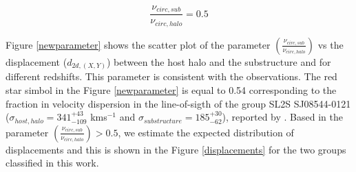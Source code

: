 \documentclass{emulateapj}
\begin{document}
\begin{equation}
 \frac{\nu_{circ,sub}}{\nu_{circ,halo}}=0.5
\end{equation}
 

Figure \ref{newparameter} shows the scatter plot of the parameter $\left(\frac{\nu_{circ,sub}}{\nu_{circ,halo}}\right)$ vs the 
displacement ($d_{2d,(X,Y)}$) between the host halo and the substructure and for different redshifts. This parameter is 
consistent with the observations. The red star simbol in the Figure \ref{newparameter} is equal to 0.54 corresponding to 
the fraction in velocity dispersion in the line-of-sigth of the group SL2S SJ08544-0121 ($\sigma_{host,halo}=341^{+43}_{-109}$ kms$^{-1}$ and $\sigma_{substructure}=185^{+30}_{-62}$), reported by \citet{2013A&A...552A..80M}.
Based in the parameter $\left(\frac{\nu_{circ,sub}}{\nu_{circ,halo}}\right)>0.5$, we estimate the expected distribution of
displacements and this is shown in the Figure \ref{displacements} for the two groups classified in this work.
 
  
\begin{figure*}
\begin{center}
\end{center}
\caption{Configuration for a host halo (dashed circle) and sub-structure (black circle) in the sample. } 
\label{configuration}
\end{figure*}


\begin{figure*}
\begin{center}
\end{center}
\caption{Scatter $\left(\frac{\nu_{circ,sub}}{\nu_{circ,halo}}\right)$
  vs $d_{2d,(X,Y)}$ for different redshifts. The  horizontal dashed
  line correpond to
  $\left(\frac{\nu_{circ,sub}}{\nu_{circ,halo}}\right)=0.5$ and the
  red star simbol correspond to
  $\left(\frac{\nu_{circ,sub}}{\nu_{circ,halo}}\right)=0.54$ for SL2S
  SJ08544-0121 in \citet{2013A&A...552A..80M}. The  four top panels
  are the sample with circular velocities $>700$ kms$^{-1}$ and the
  four down panels are the sample with  circular velocities between
  300 km s$^{-1}$ to 700 kms$^{-1}$.} 
\label{newparameter}
\end{figure*}
\end{document}
